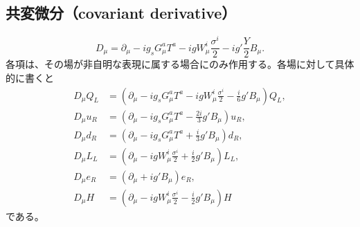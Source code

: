 \documentclass[uplatex,dvipdfmx,a4paper,11pt,openany]{jsbook}
\numberwithin{equation}{chapter}
\theoremstyle{definition}
\theoremstyle{plain}
\theoremstyle{remark}
\begin{document}
\subsection{共変微分（covariant derivative）}
\begin{equation}
D_\mu
=
\partial_\mu
-ig_sG_\mu^aT^a
-igW_\mu^i\frac{\sigma^i}{2}
-ig'\frac{Y}{2}B_\mu .
\end{equation}
各項は、その場が非自明な表現に属する場合にのみ作用する。各場に対して具体的に書くと
\begin{align}
D_\mu Q_L&=\left(\partial_\mu-ig_sG_\mu^aT^a-igW_\mu^i\frac{\sigma^i}{2}-\frac{i}{6}g'B_\mu\right)Q_L,\\
D_\mu u_R&=\left(\partial_\mu-ig_sG_\mu^aT^a-\frac{2i}{3}g'B_\mu\right)u_R,\\
D_\mu d_R&=\left(\partial_\mu-ig_sG_\mu^aT^a+\frac{i}{3}g'B_\mu\right)d_R,\\
D_\mu L_L&=\left(\partial_\mu-igW_\mu^i\frac{\sigma^i}{2}+\frac{i}{2}g'B_\mu\right)L_L,\\
D_\mu e_R&=\left(\partial_\mu+ig'B_\mu\right)e_R,\\
D_\mu H&=\left(\partial_\mu-igW_\mu^i\frac{\sigma^i}{2}-\frac{i}{2}g'B_\mu\right)H
\end{align}
である。
\end{document}
